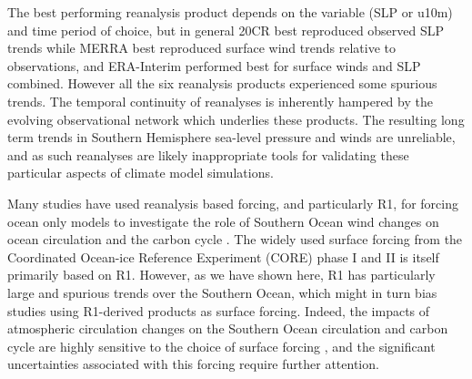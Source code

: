 \documentclass{ametsoc}
\begin{document}
The best performing reanalysis product depends on the variable (SLP or u10m) 
and time period of choice, but in general 20CR best reproduced observed SLP 
trends while MERRA best reproduced surface wind trends relative to observations,
and ERA-Interim performed best for surface winds and SLP combined. 
However all the six reanalysis products experienced some spurious trends. 
The temporal continuity of reanalyses is inherently 
hampered by the evolving observational network which underlies these products. 
The resulting long term trends in Southern Hemisphere sea-level pressure and winds are 
unreliable, and as such reanalyses are likely inappropriate tools for 
validating these particular aspects of climate model simulations.

Many studies have used reanalysis based forcing, and particularly R1, for forcing ocean 
only models to investigate the role of Southern Ocean wind changes on ocean circulation 
\citep[e.g.][]{Biastoch_et_al_2009, Screen_et_al_2009} and the carbon cycle 
\citep[e.g.][]{Le_Quere_et_al_2007, Lovenduski_et_al_2008}. The widely
used surface forcing from the Coordinated Ocean-ice Reference Experiment (CORE) phase I and II
\citep{Danabasoglu_et_al_2014, Large_and_Yeager_2009, Griffies_et_al_2009} 
is itself primarily based on R1. However, as we
have shown here, R1 has particularly large and spurious trends over the Southern 
Ocean, which might in turn bias studies using R1-derived products as surface forcing. 
Indeed, the impacts of atmospheric circulation changes on the Southern Ocean circulation
and carbon cycle are highly sensitive to the choice of surface forcing 
\citep{Swart_et_al_2014}, and the significant uncertainties associated with this forcing
require further attention.
\end{document}
